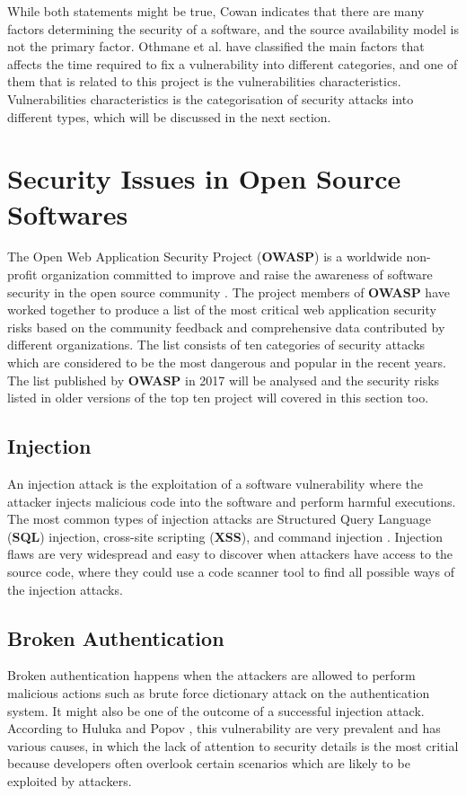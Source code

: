 \documentclass[12pt, a4paper]{report}
\begin{document}
While both statements might be true, Cowan \cite{cowan_2003} indicates that there are many factors
determining the security of a software, and the source availability model is not the primary factor.
Othmane et al. \cite{othmane_2015} have classified the main factors that affects the time required
to fix a vulnerability into different categories, and one of them that is related to this project is
the vulnerabilities characteristics. Vulnerabilities characteristics is the categorisation of
security attacks into different types, which will be discussed in the next section.

\section{Security Issues in Open Source Softwares}
The Open Web Application Security Project (\textbf{OWASP}) is a worldwide non-profit organization
committed to improve and raise the awareness of software security in the open source community
\cite{owasp_home}. The project members of \textbf{OWASP} have worked together to produce a list of
the most critical web application security risks based on the community feedback and comprehensive
data contributed by different organizations. The list consists of ten categories of security attacks
which are considered to be the most dangerous and popular in the recent years. The list published by
\textbf{OWASP} in 2017 \cite{owasp_top10} will be analysed and the security risks listed in older
versions of the top ten project will covered in this section too.

\subsection{Injection}
An injection attack is the exploitation of a software vulnerability where the attacker injects
malicious code into the software and perform harmful executions. The most common types of injection
attacks are Structured Query Language (\textbf{SQL}) injection, cross-site scripting (\textbf{XSS}),
and command injection \cite{pietraszek_2006}. Injection flaws are very widespread and easy to
discover when attackers have access to the source code, where they could use a code scanner tool to
find all possible ways of the injection attacks.

\subsection{Broken Authentication}
Broken authentication happens when the attackers are allowed to perform malicious actions such as
brute force dictionary attack on the authentication system. It might also be one of the outcome of a
successful injection attack. According to Huluka and Popov \cite{huluka_2012}, this vulnerability
are very prevalent and has various causes, in which the lack of attention to security details is the
most critial because developers often overlook certain scenarios which are likely to be exploited by
attackers.
\end{document}
